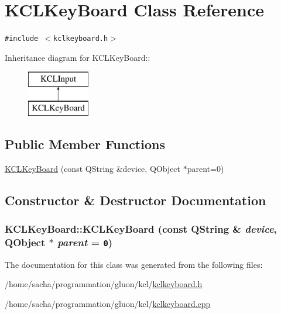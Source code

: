 \hypertarget{class_k_c_l_key_board}{
\section{KCLKeyBoard Class Reference}
\label{class_k_c_l_key_board}
}
{\tt \#include $<$kclkeyboard.h$>$}

Inheritance diagram for KCLKeyBoard::\begin{figure}[H]
\begin{center}
\leavevmode
\includegraphics[height=2cm]{class_k_c_l_key_board}
\end{center}
\end{figure}
\subsection*{Public Member Functions}
\begin{CompactItemize}
\item 
\hyperlink{class_k_c_l_key_board_55dbaf0902598d80c7ae60408b47725a}{KCLKeyBoard} (const QString \&device, QObject $\ast$parent=0)
\end{CompactItemize}


\subsection{Constructor \& Destructor Documentation}
\hypertarget{class_k_c_l_key_board_55dbaf0902598d80c7ae60408b47725a}{
\subsubsection[{KCLKeyBoard}]{\setlength{\rightskip}{0pt plus 5cm}KCLKeyBoard::KCLKeyBoard (const QString \& {\em device}, \/  QObject $\ast$ {\em parent} = {\tt 0})}}
\label{class_k_c_l_key_board_55dbaf0902598d80c7ae60408b47725a}




The documentation for this class was generated from the following files:\begin{CompactItemize}
\item 
/home/sacha/programmation/gluon/kcl/\hyperlink{kclkeyboard_8h}{kclkeyboard.h}\item 
/home/sacha/programmation/gluon/kcl/\hyperlink{kclkeyboard_8cpp}{kclkeyboard.cpp}\end{CompactItemize}
